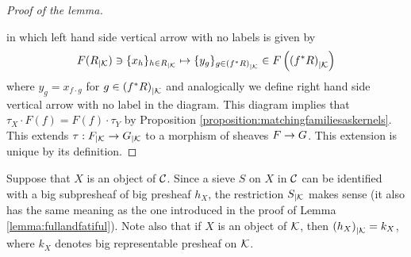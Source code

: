 \begin{proof}[Proof of the lemma]
\begin{center}
\end{center}
in which left hand side vertical arrow with no labels is given by
$$F(R_{\mid {\mathcal K}})\ni \{x_h\}_{h\in R_{\mid {\mathcal K}}}\mapsto \{y_g\}_{g\in \left(f^*R\right)_{\mid {\mathcal K}}} \in F\left(\left(f^*R\right)_{\mid {\mathcal K}}\right)$$
where $y_g = x_{f\cdot g}$ for $g\in \left(f^*R\right)_{\mid {\mathcal K}}$ and analogically we define right hand side vertical arrow with no label in the diagram. This diagram implies that $\tau_X\cdot F(f) = F(f)\cdot \tau_Y$ by Proposition \ref{proposition:matchingfamiliesaskernels}. This extends $\tau:F_{\mid {\mathcal K}}\rightarrow G_{\mid {\mathcal K}}$ to a morphism of sheaves $F\rightarrow G$. This extension is unique by its definition.
\end{proof}
\noindent
Suppose that $X$ is an object of ${\mathcal C}$. Since a sieve $S$ on $X$ in ${\mathcal C}$ can be identified with a big subpresheaf of big presheaf $h_X$, the restriction $S_{\mid {\mathcal K}}$ makes sense (it also has the same meaning as the one introduced in the proof of Lemma \ref{lemma:fullandfatiful}). Note also that if $X$ is an object of ${\mathcal K}$, then $\left(h_X\right)_{\mid {\mathcal K}} = k_X$, where $k_X$ denotes big representable presheaf on ${\mathcal K}$. 

